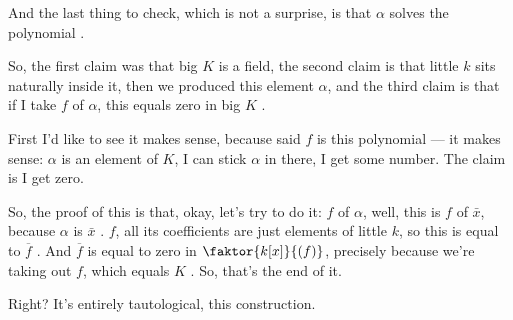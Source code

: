 \begin{hidden}
\end{hidden}

\begin{speech}[01:13:26 - 01:15:23]
And the last thing to check, which is not a surprise, is that $\alpha$ solves the polynomial .

So, the first claim was that big $K$ is a field, the second claim is that little $k$ sits naturally inside it, then we produced this element $\alpha$, and the third claim is that if I take $f$ of $\alpha$, this equals zero in big $K$ .

First I'd like to see it makes sense, because said $f$ is this polynomial --- it makes sense: $\alpha$ is an element of $K$, I can stick $\alpha$ in there, I get some number. The claim is I get zero.

So, the proof of this is that, okay, let's try to do it: $f$ of $\alpha$, well, this is $f$ of $\bar{x}$, because $\alpha$ is $\bar{x}$ . $f$, all its coefficients are just elements of little $k$, so this is equal to $\overline{f}$ . And $\overline{f}$ is equal to zero in $\faktor{k[x]}{(f)}$, precisely because we're taking out $f$, which equals $K$ . So, that's the end of it.

Right? It's entirely tautological, this construction.
\end{speech}


